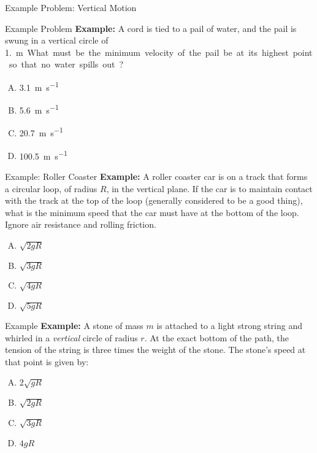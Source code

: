 \documentclass[12pt,compress,aspectratio=169]{beamer}
\begin{document}
\begin{frame}{Example Problem: Vertical Motion}
\end{frame}



\begin{frame}{Example Problem}
  \textbf{Example:} A cord is tied to a pail of water, and the pail is swung
  in a vertical circle of \SI{1.}\metre. What must be the minimum velocity of
  the pail be at its highest point so that no water spills out?
  \begin{enumerate}[(A)]
  \item\SI{3.1}{\metre\per\second}
  \item\SI{5.6}{\metre\per\second}
  \item\SI{20.7}{\metre\per\second}
  \item\SI{100.5}{\metre\per\second}
  \end{enumerate}
\end{frame}



\begin{frame}{Example: Roller Coaster}
  \textbf{Example:} A roller coaster car is on a track that forms a circular
  loop, of radius $R$, in the vertical plane. If the car is to maintain contact
  with the track at the top of the loop (generally considered to be a good
  thing), what is the minimum speed that the car must have at the bottom of the
  loop. Ignore air resistance and rolling friction.
  \begin{enumerate}[(A)]
  \item $\sqrt{2gR}$
  \item $\sqrt{3gR}$
  \item $\sqrt{4gR}$
  \item $\sqrt{5gR}$
  \end{enumerate}
\end{frame}



\begin{frame}{Example}
  \textbf{Example:} A stone of mass $m$ is attached to a light strong string
  and whirled in a \emph{vertical} circle of radius $r$. At the exact bottom of
  the path, the tension of the string is three times the weight of the stone.
  The stone's speed at that point is given by:
  \begin{enumerate}[(A)]
  \item $2\sqrt{gR}$
  \item $\sqrt{2gR}$
  \item $\sqrt{3gR}$
  \item $4gR$
  \end{enumerate}
\end{frame}
\end{document}
